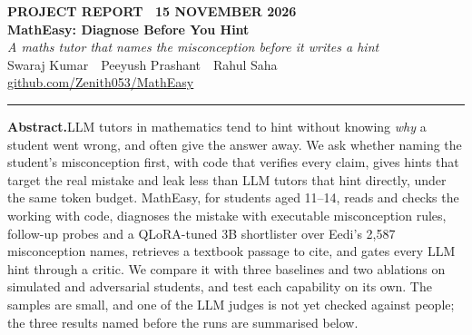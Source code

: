 \documentclass[11pt,a4paper]{article}
\begin{document}
\thispagestyle{plain}
\begin{center}
{\sffamily\footnotesize\bfseries\color{primary}PROJECT REPORT \textperiodcentered\ 15 NOVEMBER 2026}\\[6pt]
{\sffamily\bfseries\fontsize{24}{28}\selectfont\color{ink}MathEasy: Diagnose Before You Hint}\\[6pt]
{\itshape\large\color{muted}A maths tutor that names the misconception before it writes a hint}\\[10pt]
{\small Swaraj Kumar \,\textperiodcentered\, Peeyush Prashant \,\textperiodcentered\, Rahul Saha}\\[4pt]
{\small\sffamily\href{https://github.com/Zenith053/MathEasy}{\color{primary}github.com/Zenith053/MathEasy}}\\[8pt]
{\color{primary!40}\rule{0.5\linewidth}{0.6pt}}
\end{center}
\vspace{2pt}

\begin{abstractbox}
{\sffamily\bfseries\color{primary}Abstract.}\enspace LLM tutors in mathematics tend to hint without knowing \emph{why} a student went wrong, and often give the answer away. We ask whether naming the student's misconception first, with code that verifies every claim, gives hints that target the real mistake and leak less than LLM tutors that hint directly, under the same token budget. MathEasy, for students aged 11--14, reads and checks the working with code, diagnoses the mistake with executable misconception rules, follow-up probes and a QLoRA-tuned 3B shortlister over Eedi's 2,587 misconception names, retrieves a textbook passage to cite, and gates every LLM hint through a critic. We compare it with three baselines and two ablations on simulated and adversarial students, and test each capability on its own. The samples are small, and one of the LLM judges is not yet checked against people; the three results named before the runs are summarised below.
\end{abstractbox}
\end{document}
